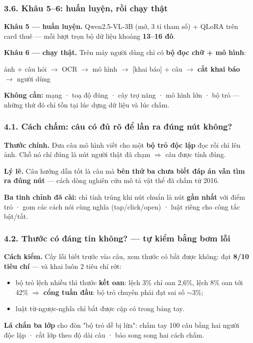 \documentclass[10pt]{beamer}
\newcommand{\dn}[1]{{\color{dnteal}\textbf{#1}}}
\newcommand{\vd}[1]{{\color{vdblue}\textbf{#1}}}
\newcommand{\ann}[1]{{\color{annmar}\textbf{#1}}}
\newcommand{\nv}[1]{{\color{daunavy}\textbf{#1}}}
\begin{document}
\begin{frame}
  \frametitle{3.6. Khâu 5--6: huấn luyện, rồi chạy thật}
  \begin{block}{}
    \dn{Khâu 5 --- huấn luyện.} Qwen2.5-VL-3B (mở, 3 tỉ tham số) + QLoRA trên card thuê --- mỗi lượt trọn bộ dữ liệu khoảng \nv{13--16 đô}.
  \end{block}
  \begin{block}{}
    \dn{Khâu 6 --- chạy thật.} Trên máy người dùng chỉ có \nv{bộ đọc chữ + mô hình}:\\[1ex]
    \centerline{ảnh + câu hỏi \(\rightarrow\) OCR \(\rightarrow\) mô hình \(\rightarrow\) {\small[khai báo]} + câu \(\rightarrow\) \nv{cắt khai báo} \(\rightarrow\) người dùng}
  \end{block}
  \begin{block}{}
    \vd{Không cần:} mạng · toạ độ đúng · cây trợ năng · mô hình lớn · bộ trỏ --- những thứ đó chỉ tồn tại lúc dựng dữ liệu và lúc chấm.
  \end{block}
\end{frame}

\begin{frame}
  \frametitle{4.1. Cách chấm: câu có đủ rõ để lần ra đúng nút không?}
  \begin{block}{}
    \dn{Thước chính.} Đưa câu mô hình viết cho một \nv{bộ trỏ độc lập} đọc rồi chỉ lên ảnh. Chỗ nó chỉ đúng là nút người thật đã chạm \(\Rightarrow\) câu được tính đúng.
  \end{block}
  \begin{block}{}
    \vd{Lý lẽ.} Câu hướng dẫn tốt là câu mà \nv{bên thứ ba chưa biết đáp án vẫn tìm ra đúng nút} --- cách dòng nghiên cứu mô tả vật thể đã chấm từ 2016.
  \end{block}
  \vspace{0.6ex}
  \dn{Ba tinh chỉnh đã cài:} chỉ tính trúng khi nút chuẩn là nút \nv{gần nhất} với điểm trỏ · gom các cách nói cùng nghĩa (tap/click/open) · luật riêng cho công tắc bật/tắt.
\end{frame}

\begin{frame}
  \frametitle{4.2. Thước có đáng tin không? --- tự kiểm bằng bơm lỗi}
  \begin{block}{}
    \dn{Cách kiểm.} Cấy lỗi biết trước vào câu, xem thước có bắt được không: đạt \nv{8/10 tiêu chí} --- và khai luôn 2 tiêu chí rớt:
    \begin{itemize}
      \item bộ trỏ lệch nhiều thì thước \ann{kết oan}: lệch 3\% chỉ oan 2,6\%, lệch 8\% oan tới 42\% \(\Rightarrow\) \nv{cổng tuần đầu}: bộ trỏ chuyên phải đạt sai số \(\sim\)3\%;
      \item luật từ-ngược-nghĩa chỉ bắt được cặp có trong bảng tay.
    \end{itemize}
  \end{block}
  \begin{block}{}
    \vd{Lá chắn ba lớp} cho đòn "bộ trỏ dễ bị lừa": chấm tay 100 câu bằng hai người độc lập · cắt lớp theo độ dài câu · báo song song hai cách chấm.
  \end{block}
\end{frame}
\end{document}
